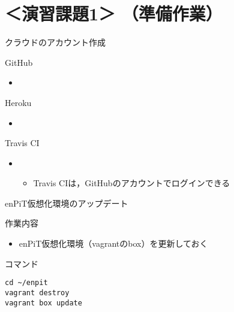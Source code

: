 \documentclass[t, aspectratio=169]{beamer}
\begin{document}
\section{＜演習課題1＞ （準備作業）}
\label{sec-1-5}
\begin{frame}[label=sec-1-5-1]{クラウドのアカウント作成}
\begin{block}{GitHub}
\begin{itemize}
\item{}
\end{itemize}
\end{block}

\begin{block}{Heroku}
\begin{itemize}
\item{}
\end{itemize}
\end{block}

\begin{block}{Travis CI}
\begin{itemize}
\item{}
\begin{itemize}
\item Travis CIは，GitHubのアカウントでログインできる
\end{itemize}
\end{itemize}
\end{block}
\end{frame}

\begin{frame}[fragile,label=sec-1-5-2]{enPiT仮想化環境のアップデート}
 \begin{block}{作業内容}
\begin{itemize}
\item enPiT仮想化環境（vagrantのbox）を更新しておく
\end{itemize}
\end{block}

\begin{block}{コマンド}
\begin{verbatim}
cd ~/enpit
vagrant destroy
vagrant box update
\end{verbatim}
\end{block}
\end{frame}
\end{document}
